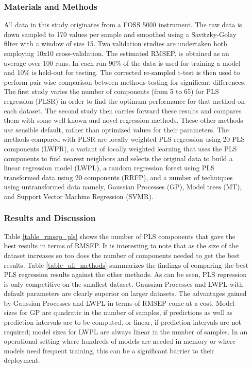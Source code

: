 \documentclass{llncs}
\begin{document}
\begin{itemize}
\subsubsection{Materials and Methods}
All data in this study originates from a FOSS 5000 instrument. The raw data is down sampled to 170 values per sample and smoothed using a Savitzky-Golay filter with a window of size 15. Two validation studies are undertaken both employing 10x10 cross-validation. The estimated RMSEP, is obtained as an average over 100 runs. In each run 90\% of the data is used for training a model and 10\% is held-out for testing. The corrected re-sampled t-test is then used to perform pair wise comparison between methods testing for significant differences. The first study varies the number of components (from 5 to 65) for PLS regression (PLSR) in order to find the optimum performance for that method on each dataset. The second study then carries forward these results and compares them with some well-known and novel regression methods. These other methods use sensible default, rather than optimized values for their parameters. The methods compared with PLSR are locally weighted PLS regression using 20 PLS components (LWPR), 
a variant of locally weighted learning that uses the PLS components to find nearest neighbors and selects the original data to build a linear regression model (LWPL), a random regression forest using PLS transformed data using 20 components (RRFP), and a number of techniques using untransformed data namely, Gaussian Processes (GP), Model trees (MT), and Support Vector Machine Regression (SVMR).

\subsubsection{Results and Discussion}
Table \ref{table_rmsep_pls} shows the number of PLS components that gave the best results in terms of RMSEP. It is interesting to note that as the size of the dataset increases so too does the number of components needed to get the best results. Table \ref{table_all_methods} summarizes the findings of comparing the best PLS regression results against the other methods. As can be seen, PLS regression is only competitive on the smallest dataset. Gaussian Processes and LWPL with default parameters are clearly superior on larger datasets. The advantages gained by Gaussian Processes and LWPL in terms of RMSEP come at a cost. Model sizes for GP are quadratic in the number of samples, if predictions as well as prediction intervals are to be computed, or linear, if prediction intervals are not required; model sizes for LWPL are always linear in the number of samples. In an operational setting where hundreds of models are needed in memory or where models need frequent training, this can be a significant barrier to 
their deployment.


\end{itemize}
\end{document}
